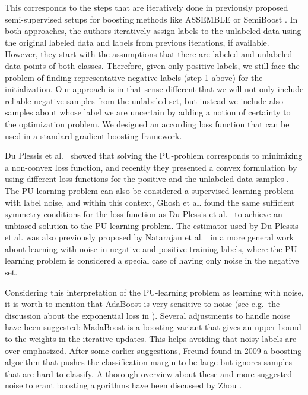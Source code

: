 This corresponds to the steps that are iteratively done in previously proposed semi-supervised setups for boosting methods like ASSEMBLE \cite{bennett2002exploiting} or SemiBoost \cite{mallapragada2009semiboost}. In both approaches, the authors iteratively assign labels to the unlabeled data using the original labeled data and labels from previous iterations, if available. However, they start with the assumptions that there are labeled and unlabeled data points of both classes. Therefore, given only positive labels, we still face the problem of finding representative negative labels (step 1 above) for the initialization. Our approach is in that sense different that we will not only include reliable negative samples from the unlabeled set, but instead we include also samples about whose label we are uncertain by adding a notion of certainty to the optimization problem. We designed an according loss function that can be used in a standard gradient boosting framework.

Du Plessis et al.\ \cite{plessis2014PUanalysis} showed that solving the PU-problem corresponds to minimizing a non-convex loss function, and recently they presented a convex formulation by using different loss functions for the positive and the unlabeled data samples \cite{plessis2015convex}. The PU-learning problem can also be considered a supervised learning problem with label noise, and within this context, Ghosh et al. \cite{ghosh2015making} found the same sufficient symmetry conditions for the loss function as Du Plessis et al.\ \cite{plessis2014PUanalysis} to achieve an unbiased solution to the PU-learning problem. The estimator used by Du Plessis et al. was also previously proposed by Natarajan et al.\ \cite{natarajan2013learning} in a more general work about learning with noise in negative and positive training labels, where the PU-learning problem is considered a special case of having only noise in the negative set.

Considering this interpretation of the PU-learning problem as learning with noise, it is worth to mention that AdaBoost is very sensitive to noise (see e.g.\ the discussion about the exponential loss in \cite{friedman2009elements}). Several adjustments to handle noise have been suggested: MadaBoost \cite{domingo2000madaboost} is a boosting variant that gives an upper bound to the weights in the iterative updates. This helps avoiding that noisy labels are over-emphasized. 
After some earlier suggestions, Freund found in 2009 a boosting algorithm \cite{freund2009more} that pushes the classification margin to be large but ignores samples that are hard to classify. A thorough overview about these and more suggested noise tolerant boosting algorithms have been discussed by Zhou \cite{zhou2012ensemble}.